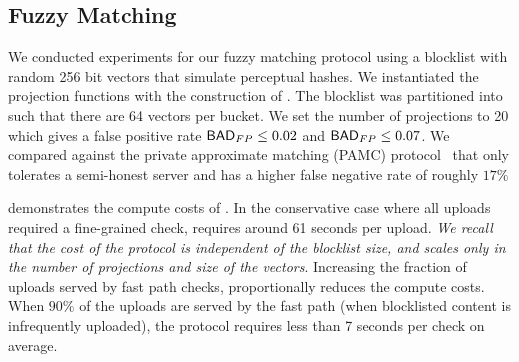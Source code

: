 \subsection{Fuzzy Matching}
%
We conducted experiments for our fuzzy matching protocol \protocolFM using a blocklist with random 256 bit vectors that simulate perceptual hashes. We instantiated the projection functions with the construction of \citet{chongchitmate2024approximate}. The blocklist was partitioned into \numBlocklistParts such that there are 64 vectors per bucket. We set the number of projections to 20 which gives a false positive rate $\mathsf{BAD}_{FP} \le 0.02$ and $\mathsf{BAD}_{FP} \le 0.07$. We compared against the private approximate matching (PAMC) protocol~\cite{kulshrestha2021identifying} that only tolerates a semi-honest server and has a higher false negative rate of roughly $17\%$

%
 demonstrates the compute costs of \protocolFM. In the conservative case where all uploads required a fine-grained check, \protocolFM requires around 61 seconds per upload. \emph{We recall that the cost of the protocol is independent of the blocklist size, and scales only in the number of projections and size of the vectors}.  Increasing the fraction of uploads served by fast path checks, proportionally reduces the compute costs. When $90\%$ of the uploads are served by the fast path (when blocklisted content is infrequently uploaded), the protocol requires less than 7 seconds per check on average. 


%




